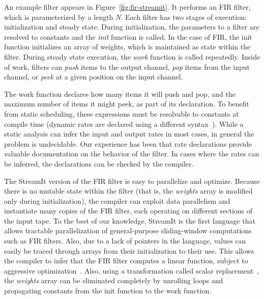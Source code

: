An example filter appears in Figure~\ref{fig:fir-streamit}.  It
performs an FIR filter, which is parameterized by a length {\it N}.
Each filter has two stages of execution: initialization and steady
state.  During initialization, the parameters to a filter are resolved
to constants and the {\it init} function is called.  In the case of
FIR, the init function initializes an array of weights, which is
maintained as state within the filter.  During steady state execution,
the {\it work} function is called repeatedly.  Inside of work, filters
can {\it push} items to the output channel, {\it pop} items from the
input channel, or {\it peek} at a given position on the input channel.

The work function declares how many items it will push and pop, and
the maximum number of items it might peek, as part of its declaration.
To benefit from static scheduling, these expressions must be
resolvable to constants at compile time (dynamic rates are declared
using a different syntax~\cite{streamit-lang-spec}). While a static
analysis can infer the input and output rates in most cases, in
general the problem is undecidable.  Our experience has been that rate
declarations provide valuable documentation on the behavior of the
filter.  In cases where the rates can be inferred, the declarations
can be checked by the compiler.

The StreamIt version of the FIR filter is easy to parallelize and
optimize.  Because there is no mutable state within the filter (that
is, the {\it weights} array is modified only during initialization),
the compiler can exploit data parallelism and instantiate many copies
of the FIR filter, each operating on different sections of the input
tape.  To the best of our knowledge, StreamIt is the first language
that allows tractable parallelization of general-purpose
sliding-window computations such as FIR filters.  Also, due to a lack
of pointers in the language, values can easily be traced through
arrays from their initialization to their use.  This allows the
compiler to infer that the FIR filter computes a linear function,
subject to aggressive optimization~\cite{streamit-linear}.  Also,
using a transformation called scalar
replacement~\cite{sermulins:lctes:2005}, the {\it weights} array can
be eliminated completely by unrolling loops and propagating constants
from the init function to the work function.

